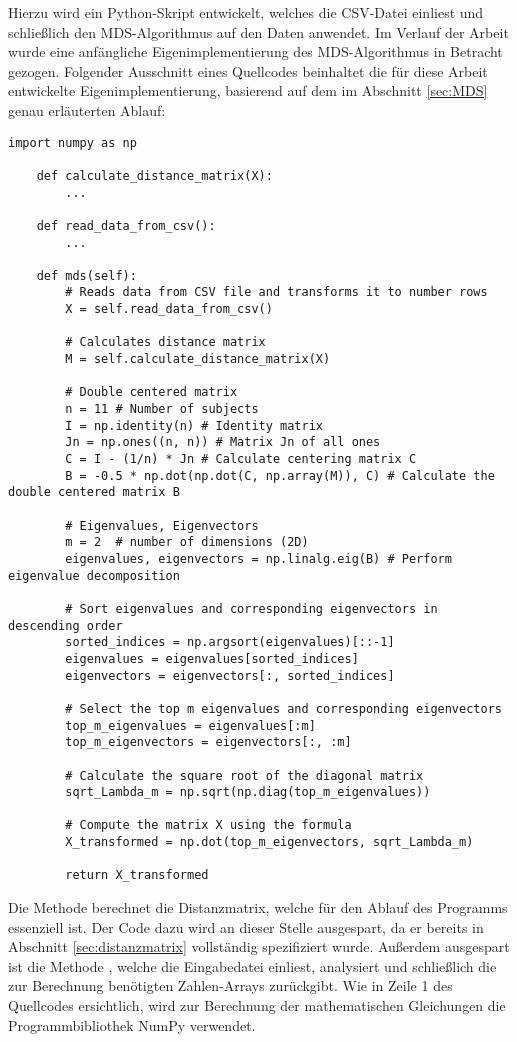 Hierzu wird ein Python-Skript entwickelt, welches die CSV-Datei einliest und
schließlich den MDS-Algorithmus auf den Daten anwendet. Im Verlauf der
Arbeit wurde eine anfängliche Eigenimplementierung des MDS-Algorithmus in
Betracht gezogen. Folgender Ausschnitt eines Quellcodes beinhaltet die für diese
Arbeit entwickelte Eigenimplementierung, basierend auf dem im Abschnitt
\ref{sec:MDS} genau erläuterten Ablauf:

\begin{lstlisting}[style=Python]
    import numpy as np

    def calculate_distance_matrix(X):
        ...

    def read_data_from_csv():
        ...

    def mds(self):
        # Reads data from CSV file and transforms it to number rows
        X = self.read_data_from_csv()

        # Calculates distance matrix
        M = self.calculate_distance_matrix(X)

        # Double centered matrix
        n = 11 # Number of subjects
        I = np.identity(n) # Identity matrix
        Jn = np.ones((n, n)) # Matrix Jn of all ones
        C = I - (1/n) * Jn # Calculate centering matrix C
        B = -0.5 * np.dot(np.dot(C, np.array(M)), C) # Calculate the double centered matrix B

        # Eigenvalues, Eigenvectors
        m = 2  # number of dimensions (2D)
        eigenvalues, eigenvectors = np.linalg.eig(B) # Perform eigenvalue decomposition

        # Sort eigenvalues and corresponding eigenvectors in descending order
        sorted_indices = np.argsort(eigenvalues)[::-1]
        eigenvalues = eigenvalues[sorted_indices]
        eigenvectors = eigenvectors[:, sorted_indices]

        # Select the top m eigenvalues and corresponding eigenvectors
        top_m_eigenvalues = eigenvalues[:m]
        top_m_eigenvectors = eigenvectors[:, :m]

        # Calculate the square root of the diagonal matrix
        sqrt_Lambda_m = np.sqrt(np.diag(top_m_eigenvalues))

        # Compute the matrix X using the formula
        X_transformed = np.dot(top_m_eigenvectors, sqrt_Lambda_m)

        return X_transformed
\end{lstlisting}

Die Methode  berechnet die Distanzmatrix,
welche für den Ablauf des Programms essenziell ist. Der Code dazu wird an
dieser Stelle ausgespart, da er bereits in Abschnitt \ref{sec:distanzmatrix}
vollständig spezifiziert wurde. Außerdem ausgespart ist die Methode
, welche die Eingabedatei einliest, analysiert und
schließlich die zur Berechnung benötigten Zahlen-Arrays zurückgibt. Wie in Zeile
1 des Quellcodes ersichtlich, wird zur Berechnung der mathematischen Gleichungen
die Programmbibliothek NumPy verwendet. \parencite{numpy}

